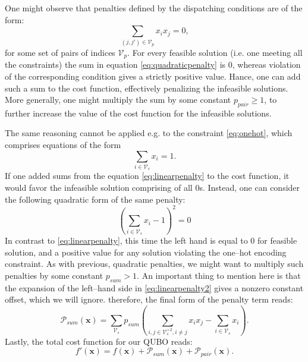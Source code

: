 One might observe that penalties defined by the dispatching conditions are of
the form:
\begin{equation}
  \label{eq:quadraticpenalty}
  \sum_{(j, j') \in \mathcal{V}_{p}} x_{i}x_{j} = 0,
\end{equation}
for some set of pairs of indices $\mathcal{V}_{p}$. For every feasible solution
(i.e. one meeting all the constraints) the sum in equation
\eqref{eq:quadraticpenalty} is 0, whereas violation of the corresponding
condition gives a strictly positive value. Hance, one can add such a sum to the
cost function, effectively penalizing the infeasible solutions. More generally,
one might multiply the sum by some constant $p_{pair} \ge 1$, to further
increase the value of the cost function for the infeasible solutions.

The same reasoning cannot be applied e.g. to the constraint \eqref{eq:onehot},
which comprises equations of the form
\begin{equation}
  \label{eq:linearpenalty}
  \sum_{i \in \mathcal{V}_{s}}x_{i} = 1.
\end{equation}
If one added sums from the equation \eqref{eq:linearpenalty} to the cost
function, it would favor the infeasible solution comprising of all 0s. Instead,
one can consider the following quadratic form of the same penalty:
\begin{equation}
  \label{eq:linearpenalty2}
  \left(\sum_{i \in \mathcal{V}_{s}}x_{i} -1 \right)^{2} = 0
\end{equation}
In contrast to \eqref{eq:linearpenalty}, this time the left hand is equal to 0
for feasible solution, and a positive value for any solution violating the
one--hot encoding constraint. As with previous, quadratic penalties, we might
want to multiply such penalties by some constant $p_{sum} > 1$. An important
thing to mention here is that the expansion of the left--hand side in
\eqref{eq:linearpenalty2} gives a nonzero constant offset, which we will
ignore. therefore, the final form of the penalty term reads:
\begin{equation}
  \mathcal{P}_{sum}(\mathbf{x}) = \sum_{\mathcal{V}_{s}}p_{sum}\left(\sum_{i,j \in \mathcal{V}_{s}^{\times 2}, i\ne j} x_{i}x_{j}  - \sum_{i \in \mathcal{V}_{s}}x_{i}\right).
\end{equation}
Lastly, the total cost function for our QUBO reads:
\begin{equation}
  f'(\mathbf{x}) = f(\mathbf{x}) + \mathcal{P}_{sum}(\mathbf{x}) + \mathcal{P}_{pair}(\mathbf{x}).
\end{equation}
